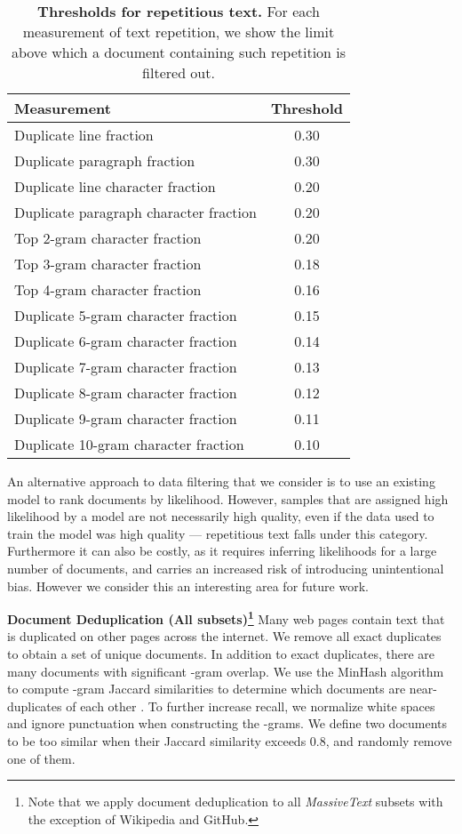 \documentclass[11pt, a4paper, logo, internal, copyright, nonumbering]{deepmind}
\newcommand{\massivetext}{\textit{MassiveText}\xspace}
\begin{document}
\begin{table*}[t]
\centering
\begin{tabular}{l c}
\toprule
Measurement & Threshold \\
\midrule
Duplicate line fraction & 0.30  \\
Duplicate paragraph fraction & 0.30  \\
Duplicate line character fraction & 0.20  \\
Duplicate paragraph character fraction & 0.20  \\
Top 2-gram character fraction & 0.20  \\
Top 3-gram character fraction & 0.18  \\
Top 4-gram character fraction & 0.16  \\
Duplicate 5-gram character fraction & 0.15  \\
Duplicate 6-gram character fraction & 0.14  \\
Duplicate 7-gram character fraction & 0.13  \\
Duplicate 8-gram character fraction & 0.12  \\
Duplicate 9-gram character fraction & 0.11  \\
Duplicate 10-gram character fraction & 0.10  \\
\bottomrule
\end{tabular}
    \caption{\textbf{Thresholds for repetitious text.} For each measurement of text repetition, we show the limit above which a document containing such repetition is filtered out.}
    \label{tab:duplicates}
\end{table*}

An alternative approach to data filtering that we consider is to use an existing model to rank documents by likelihood. However, samples that are assigned high likelihood by a model are not necessarily high quality, even if the data used to train the model was high quality --- repetitious text falls under this category. Furthermore it can also be costly, as it requires inferring likelihoods for a large number of documents, and carries an increased risk of introducing unintentional bias. However we consider this an interesting area for future work.

\noindent \textbf{Document Deduplication (All subsets)\footnote{Note that we apply document deduplication to all \massivetext subsets with the exception of Wikipedia and GitHub.}}
Many web pages contain text that is duplicated on other pages across the internet. We remove all exact duplicates to obtain a set of unique documents.  In addition to exact duplicates, there are many documents with significant -gram overlap. We use the MinHash algorithm to compute -gram Jaccard similarities to determine which documents are near-duplicates of each other \citep{lee2021dedup}. To further increase recall, we normalize white spaces and ignore punctuation when constructing the -grams. We define two documents to be too similar when their Jaccard similarity exceeds 0.8, and randomly remove one of them.
\end{document}
